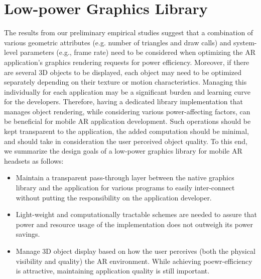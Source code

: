 \section{Low-power Graphics Library}
\label{sec:system}

    

The results from our preliminary empirical studies suggest that a combination of
various geometric attributes (e.g. number of triangles and draw calls) and 
system-level parameters (e.g., frame rate) need to be considered when optimizing 
the AR application's graphics rendering requests for power efficiency.
%
Moreover, if there are several 3D objects to be displayed, each object may 
need to be optimized separately depending on their texture or motion 
characteristics. Managing this individually for each
application may be a significant burden and learning curve for the 
developers.
%
Therefore, having a dedicated library implementation that manages object
rendering, while considering various power-affecting factors, can be
beneficial for mobile AR application development.
%
Such operations should be kept transparent to the application, the added 
computation should be minimal, and should take in consideration the user perceived object quality.
%
To this end, we summarize the design goals of a low-power graphics library for 
mobile AR headsets as follows:


\begin{itemize}[leftmargin=*]

    \item Maintain a transparent pass-through layer between the native graphics
        library and the application for various programs to easily inter-connect
        without putting the responsibility on the application developer.
    
    \item Light-weight and computationally tractable schemes are needed
        to assure that power and resource usage of the 
        implementation does not outweigh its power savings.
    
    \item Manage 3D object display based on how the user perceives
        (both the physical visibility and quality) the AR environment.
        While achieving poewr-efficiency is attractive, maintaining application quality is still important.
    
\end{itemize}


